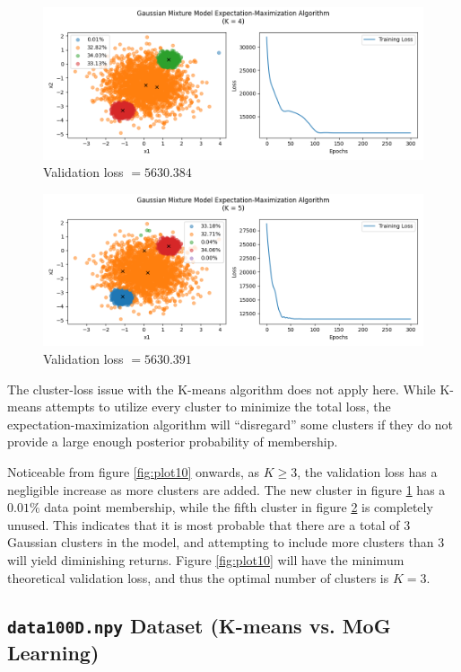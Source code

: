 \documentclass[letterpaper]{article}
\begin{document}
\begin{figure}[H]
	\centering
	\includegraphics[width=\linewidth]{Figure_11}
	\caption{Validation loss $ = 5630.384$}
	\label{fig:plot11}
\end{figure}

\begin{figure}[H]
	\centering
	\includegraphics[width=\linewidth]{Figure_12}
	\caption{Validation loss $ = 5630.391$}
	\label{fig:plot12}
\end{figure}

The cluster-loss issue with the K-means algorithm does not apply here. While K-means attempts to utilize every cluster to minimize the total loss, the expectation-maximization algorithm will ``disregard'' some clusters if they do not provide a large enough posterior probability of membership. 

Noticeable from figure \ref{fig:plot10} onwards, as $K \ge 3$, the validation loss has a negligible increase as more clusters are added. The new cluster in figure \ref{fig:plot11} has a $0.01\%$ data point membership, while the fifth cluster in figure \ref{fig:plot12} is completely unused. This indicates that it is most probable that there are a total of $3$ Gaussian clusters in the model, and attempting to include more clusters than $3$ will yield diminishing returns. Figure \ref{fig:plot10} will have the minimum theoretical validation loss, and thus the optimal number of clusters is $K = 3$.

\subsection{\texttt{data100D.npy} Dataset (K-means vs. MoG Learning)}
\end{document}
